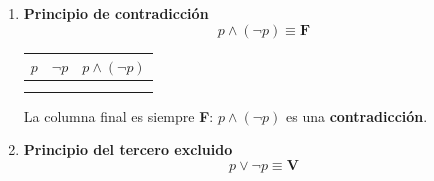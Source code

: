 \begin{enumerate}[label=\alph*)]
\begin{center}
	\renewcommand{\arraystretch}{1.4}
	\begin{tabular}{|c|c|c|c|c|}
		\hline
		$p$ & $q$ & $p \vee q$ & $p \land (p \vee q)$ & $[p \land (p \vee q)] \equiv p$ \\
		\hline
		\V & \V & \V & \V & \V \\
		\hline
		\V & \F & \V & \V & \V \\
		\hline
		\F & \V & \V & \F & \V \\
		\hline
		\F & \F & \F & \F & \V \\
		\hline
	\end{tabular}
\end{center}

\begin{center}
	\renewcommand{\arraystretch}{1.4}
	\begin{tabular}{|c|c|c|c||c|}
		\hline
		$p$ & $q$ & $p \land q$ & $p \vee (p \land q)$ & $p \vee (p \land q) \equiv p$ \\
		\hline
		\V & \V & \V & \V & \V \\
		\hline
		\V & \F & \F & \V & \V \\
		\hline
		\F & \V & \F & \F & \V \\
		\hline
		\F & \F & \F & \F & \V \\
		\hline
	\end{tabular}
\end{center}

\item \textbf{Principio de contradicción}
\[p \land (\lnot p) \equiv \mathbf{F}\]

\begin{center}
	\renewcommand{\arraystretch}{1.4}
	\begin{tabular}{|c|c|c|}
		\hline
		$p$ & $\lnot p$ & $p \land (\lnot p)$ \\
		\hline
		\V & \F & \F \\
		\hline
		\F & \V & \F \\
		\hline
	\end{tabular}
\end{center}
\noindent La columna final es siempre \textbf{F}: $p \land (\lnot p)$ es una \textbf{contradicción}.

\item \textbf{Principio del tercero excluido}
\[p \vee \lnot p \equiv \mathbf{V}\]


\end{enumerate}

